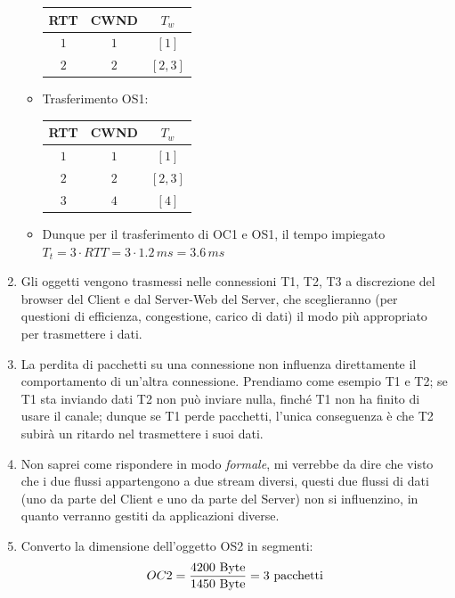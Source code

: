 \documentclass[10pt]{article}
\newcommand{\lightrule}{%
	\arrayrulecolor{black!30}%
	\midrule[\lightrulewidth]%
	\arrayrulecolor{black}}
\begin{document}
\begin{enumerate}
\begin{itemize}
\begin{center}
\begin{tabular}{@{} *{3}{c} @{}}
 					\textbf{RTT} & \textbf{CWND} & \textbf{$T_w$} \\ 
 				\midrule
 					$1$ & $1$ & $[1]$ \\ 
				\lightrule
 					$2$ & $2$ & $[2,3]$ \\
				\bottomrule
				\end{tabular}
			\end{center}
			\item Trasferimento OS1:
			\begin{center}
				\centering
 				\begin{tabular}{@{} *{3}{c} @{}}
 				\toprule
 					\textbf{RTT} & \textbf{CWND} & \textbf{$T_w$} \\
 				\midrule
 					$1$ & $1$ & $[1]$ \\ 
				\lightrule
 					$2$ & $2$ & $[2,3]$ \\
 				\lightrule
 					$3$ & $4$ & $[4]$ \\
				\bottomrule
				\end{tabular}
			\end{center}
			\item Dunque per il trasferimento di OC1 e OS1, il tempo impiegato $T_t = 3 \cdot RTT = 3 \cdot 1.2 \,ms = 3.6 \,ms$
		\end{itemize}
	\item Gli oggetti vengono trasmessi nelle connessioni T1, T2, T3 a discrezione del browser del Client e dal Server-Web del Server, che sceglieranno (per questioni di efficienza, congestione, carico di dati) il modo più appropriato per trasmettere i dati.
	\item La perdita di pacchetti su una connessione non influenza direttamente il comportamento di un'altra connessione. Prendiamo come esempio T1 e T2; se T1 sta inviando dati T2 non può inviare nulla, finché T1 non ha finito di usare il canale; dunque se T1 perde pacchetti, l'unica conseguenza è che T2 subirà un ritardo nel trasmettere i suoi dati.
	\color{red}
	\item  Non saprei come rispondere in modo \textit{formale}, mi verrebbe da dire che visto che i due flussi appartengono a due stream diversi, questi due flussi di dati (uno da parte del Client e uno da parte del Server) non si influenzino, in quanto verranno gestiti da applicazioni diverse.
	\color{black}
	\item Converto la dimensione dell'oggetto OS2 in segmenti:
		 	\begin{equation}
			\notag
			\begin{split}
				OC2 & = \frac{4200 \textrm{ Byte}}{1450 \textrm{ Byte}} = 3 \textrm{ pacchetti}\\

\end{split}
\end{equation}
\end{enumerate}
\end{document}
